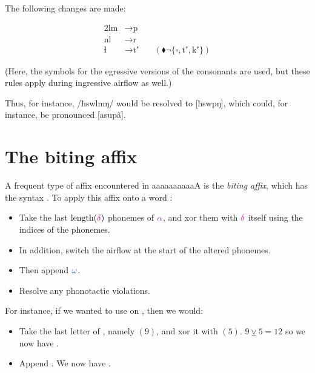 \documentclass{book}
\newcommand{\lname}{aaaaaaaaaaA}
\begin{document}
The following changes are made:

\begin{alignat*}{2}
  \text{lm} &\rightarrow \text{p} &\quad \\
  \text{nl} &\rightarrow \text{r} &\quad \\
  \text{ɬ} &\rightarrow \text{tʼ} &\quad(\blacklozenge \lnot \{\square, \text{tʼ}, \text{kʼ}\})
\end{alignat*}

(Here, the symbols for the egressive versions of the consonants are used, but these rules apply during ingressive airflow as well.)

Thus, for instance, /ħswlmŋ/ would be resolved to [ħswpŋ], which could, for instance, be pronounced [asupã].

\section{The biting affix}

A frequent type of affix encountered in \lname{} is the \emph{biting affix}, which has the syntax \hortho{->\hliv{$\delta$}:\hliii{$\omega$}}. To apply this affix onto a word \hli{$\alpha$}:

\begin{itemize}
  \item Take the last $\text{length}(\hliv{\delta})$ phonemes of $\hli{\alpha}$, and xor them with $\hliv{\delta}$ itself using the indices of the phonemes.
  \item In addition, switch the airflow at the start of the altered phonemes.
  \item Then append $\hliii{\omega}$.
  \item Resolve any phonotactic violations.
\end{itemize}

For instance, if we wanted to use  on , then we would:

\begin{itemize}
  \item Take the last letter of , namely  $(9)$, and xor it with  $(5)$. $9 \veebar 5 = 12$ so we now have .
  \item Append . We now have .
\end{itemize}
\end{document}
